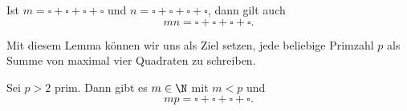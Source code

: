 \begin{lem}\autolabel
	Ist $m = \square + \square + \square + \square$ und $n = \square + \square + \square + \square$, dann gilt auch
	\[ mn = \square + \square + \square + \square. \]
\end{lem}

Mit diesem Lemma können wir uns als Ziel setzen, jede beliebige Primzahl $p$ als Summe von maximal vier Quadraten zu schreiben.

\begin{lem}\autolabel
	Sei $p>2$ prim. Dann gibt es $m \in \N$ mit $m<p$ und 
	\[ mp = \square + \square + \square + \square. \]
\end{lem}